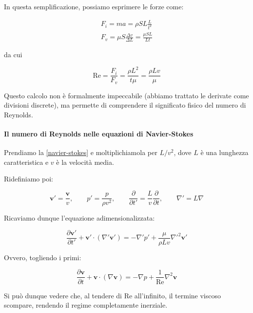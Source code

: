 \documentclass[12pt,a4paper]{article}
\numberwithin{equation}{section}
\begin{document}
In questa semplificazione, possiamo esprimere le forze come:

\begin{subequations}
\begin{align}
F_i = m a = \rho S L \frac{L}{t^2}\\
F_v = \mu S \frac{\Delta v}{\Delta L} = \frac{\mu S L}{Lt}
\end{align}
\end{subequations}

da cui

\begin{equation}
\text{Re} = \frac{F_i}{F_v} =  \frac{\rho L^2}{t \mu} = \frac{\rho L v}{\mu}
\end{equation}

Questo calcolo non è formalmente impeccabile (abbiamo trattato le derivate come divisioni discrete), ma permette di comprendere il significato fisico del numero di Reynolds.

\paragraph{Il numero di Reynolds nelle equazioni di Navier-Stokes}

Prendiamo la \eqref{navier-stokes} e moltiplichiamola per $L/v^2$, dove $L$ è una lunghezza caratteristica e $v$ è la velocità media.

Ridefiniamo poi: 

\begin{equation}
\mathbf{v'} = \frac{\mathbf{v}}{v},\qquad p' = \frac{p}{\rho v^2},\qquad \frac{\partial}{\partial t'} = \frac{L}{v} \frac{\partial}{\partial t},\qquad \nabla' = L \nabla
\end{equation}

Ricaviamo dunque l'equazione adimensionalizzata: 

\begin{equation}
\frac{\partial \mathbf{v'}}{\partial t'} +\mathbf{v'} \cdot (\nabla' \mathbf{v'})  = -\nabla' p' + \frac{\mu}{\rho L v} \nabla'^2 \mathbf{v'}
\end{equation}

Ovvero, togliendo i primi:

\begin{equation}
\frac{\partial \mathbf{v}}{\partial t} +\mathbf{v} \cdot (\nabla \mathbf{v}) = -\nabla p + \frac{1}{\text{Re}} \nabla^2 \mathbf{v}
\end{equation}

Si può dunque vedere che, al tendere di Re all'infinito, il termine viscoso scompare, rendendo il regime completamente inerziale.
\end{document}
